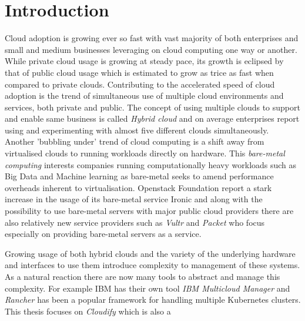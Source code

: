\section{Introduction}

Cloud adoption is growing ever so fast with vast majority of both enterprises and small and medium businesses leveraging on cloud computing one way or another. \cite{stateofthecloud} While private cloud usage is growing at steady pace, its growth is eclipsed by that of public cloud usage which is estimated to grow as trice as fast when compared to private clouds. 
Contributing to the accelerated speed of cloud adoption is the trend of simultaneous use of multiple cloud environments and services, both private and public. The concept of using multiple clouds to support and enable same business is called \textit{Hybrid cloud} and on average enterprises report using and experimenting with almost five different clouds simultaneously. 
Another 'bubbling under' trend of cloud computing is a shift away from virtualised clouds to running workloads directly on hardware. This \textit  {bare-metal computing} interests companies running computationally heavy workloads such as Big Data and Machine learning as bare-metal seeks to amend performance overheads inherent to virtualisation. Openstack Foundation report a stark increase in the usage of its bare-metal service Ironic \cite{openstacksurvey} and along with the possibility to use bare-metal servers with major public cloud providers there are also relatively new service providers such as \textit{Vultr}\cite{vultr} and \textit{Packet}\cite{packet} who focus especially on providing bare-metal servers as a service.

Growing usage of both hybrid clouds and the variety of the underlying hardware and interfaces to use them introduce complexity to management of these systems. As a natural reaction there are now many tools to abstract and manage this complexity. For example IBM has their own tool \textit{IBM Multicloud Manager}\cite{ibmmulticloud} and \textit{Rancher} has been a popular framework for handling multiple Kubernetes clusters\cite{Kubernetes}. This thesis focuses on \textit{Cloudify}\cite{cloudify} which is also a
